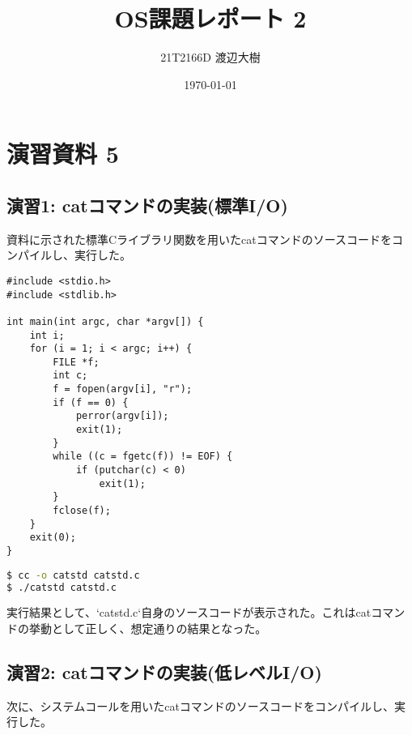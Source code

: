 \documentclass[a4paper,11pt,dvipdfmx]{jsarticle}
\begin{document}

\title{OS課題レポート 2}
\author{21T2166D 渡辺大樹}
\date{\today}
\maketitle

\section{演習資料 5}

\subsection{演習1: catコマンドの実装(標準I/O)}
資料に示された標準Cライブラリ関数を用いたcatコマンドのソースコードをコンパイルし、実行した。

\begin{lstlisting}[caption={catstd.c}, label=lst:catstd]
#include <stdio.h>
#include <stdlib.h>

int main(int argc, char *argv[]) {
    int i;
    for (i = 1; i < argc; i++) {
        FILE *f;
        int c;
        f = fopen(argv[i], "r");
        if (f == 0) {
            perror(argv[i]);
            exit(1);
        }
        while ((c = fgetc(f)) != EOF) {
            if (putchar(c) < 0)
                exit(1);
        }
        fclose(f);
    }
    exit(0);
}
\end{lstlisting}

\begin{lstlisting}[language=bash, caption={コンパイルと実行}]
$ cc -o catstd catstd.c
$ ./catstd catstd.c
\end{lstlisting}
実行結果として、`catstd.c`自身のソースコードが表示された。これはcatコマンドの挙動として正しく、想定通りの結果となった。

\subsection{演習2: catコマンドの実装(低レベルI/O)}
次に、システムコールを用いたcatコマンドのソースコードをコンパイルし、実行した。
\end{document}
